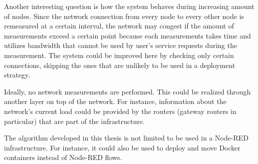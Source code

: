 Another interesting question is how the system behaves during increasing amount of nodes.
Since the network connection from every node to every other node is remeasured at a certain interval, the network may congest if the amount of measurements exceed a certain point because each measurements takes time and utilizes bandwidth that cannot be used by user's service requests during the measurement.
The system could be improved here by checking only certain connections, skipping the ones that are unlikely to be used in a deployment strategy.

Ideally, no network measurements are performed.
This could be realized through another layer on top of the network.
For instance, information about the network's current load could be provided by the routers (gateway routers in particular) that are part of the infrastructure.


The algorithm developed in this thesis is not limited to be used in a Node-RED infrastructure.
For instance, it could also be used to deploy and move Docker containers instead of Node-RED flows.